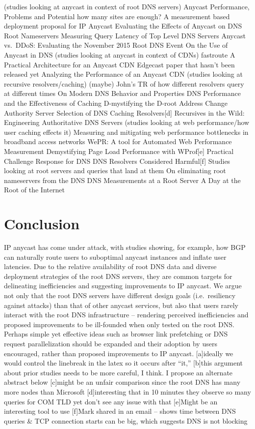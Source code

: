 \documentclass[sigconf,nonacm,10pt]{acmart}
\begin{document}
(studies looking at anycast in context of root DNS servers) Anycast
Performance, Problems and Potential how many sites are enough? A
measurement based deployment proposal for IP Anycast Evaluating the
Effects of Anycast on DNS Root Nameservers Measuring Query Latency of
Top Level DNS Servers Anycast vs.~DDoS: Evaluating the November 2015
Root DNS Event On the Use of Anycast in DNS (studies looking at anycast
in context of CDNs) fastroute A Practical Architecture for an Anycast
CDN Edgecast paper that hasn't been released yet Analyzing the
Performance of an Anycast CDN (studies looking at recursive
resolvers/caching) (maybe) John's TR of how different resolvers query at
different times On Modern DNS Behavior and Properties DNS Performance
and the Effectiveness of Caching D-mystifying the D-root Address Change
Authority Server Selection of DNS Caching Resolvers{[}d{]} Recursives in
the Wild: Engineering Authoritative DNS Servers (studies looking at web
performance/how user caching effects it) Measuring and mitigating web
performance bottlenecks in broadband access networks WePR: A tool for
Automated Web Performance Measurement Demystifying Page Load Performance
with WProf{[}e{]} Practical Challenge Response for DNS DNS Resolvers
Considered Harmful{[}f{]} Studies looking at root servers and queries
that land at them On eliminating root nameservers from the DNS DNS
Measurements at a Root Server A Day at the Root of the Internet

\fi

\section{Conclusion}\label{conclusion-1}

IP anycast has come under attack, with studies showing, for example, how
BGP can naturally route users to suboptimal anycast instances and
inflate user latencies. Due to the relative availability of root DNS
data and diverse deployment strategies of the root DNS servers, they are
common targets for delineating inefficiencies and suggesting
improvements to IP anycast. We argue not only that the root DNS servers
have different design goals (i.e.~resiliency against attacks) than that
of other anycast services, but also that users rarely interact with the
root DNS infrastructure -- rendering perceived inefficiencies and
proposed improvements to be ill-founded when only tested on the root
DNS. Perhaps simple yet effective ideas such as browser link prefetching
or DNS request parallelization should be expanded and their adoption by
users encouraged, rather than proposed improvements to IP anycast.
{[}a{]}ideally we would control the linebreak in the latex so it occurs
after ``it,'' {[}b{]}this argument about prior studies needs to be more
careful, I think. I propose an alternate abstract below {[}c{]}might be
an unfair comparison since the root DNS has many more nodes than
Microsoft {[}d{]}interesting that in 10 minutes they observe so many
queries for COM TLD yet don't see any issue with that {[}e{]}Might be an
interesting tool to use {[}f{]}Mark shared in an email -- shows time
between DNS queries \& TCP connection starts can be big, which suggests
DNS is not blocking


\end{document}
